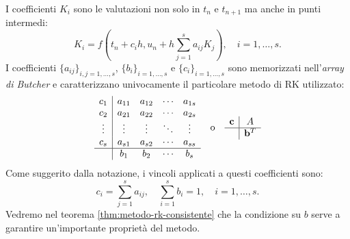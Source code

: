 I coefficienti $K_{i}$ sono le valutazioni non solo in $t_{n}$ e $t_{n+1}$ ma anche in punti intermedi:
\begin{equation}
K_{i} =f\left( t_{n} +c_{i} h,u_{n} +h\sum\limits ^{s}_{j=1} a_{ij} K_{j}\right) ,\quad i=1,\dotsc ,s.
\end{equation}
I coefficienti $\{a_{ij}\}_{i,j=1,\dotsc ,s}$, $\{b_{i}\}_{i=1,\dotsc ,s}$ e $\{c_{i}\}_{i=1,\dotsc ,s}$ sono memorizzati nell'\textit{array di Butcher} e caratterizzano univocamente il particolare metodo di RK utilizzato:
\begin{equation}
\begin{array}{ c|c c c c }
c_{1} & a_{11} & a_{12} & \cdots  & a_{1s}\\
c_{2} & a_{21} & a_{22} & \cdots  & a_{2s}\\
\vdots  & \vdots  & \vdots  & \ddots  & \vdots \\
c_{s} & a_{s1} & a_{s2} & \cdots  & a_{ss}\\
\hline
 & b_{1} & b_{2} & \cdots  & b_{s}
\end{array} \quad \text{o} \quad \begin{array}{ c|c }
\mathbf{c} & A\\
\hline
 & \mathbf{b}^{T}
\end{array}
\end{equation}
Come suggerito dalla notazione, i vincoli applicati a questi coefficienti sono:
\begin{equation}
\label{eq:ipotesi-rk}
c_{i} =\sum\limits ^{s}_{j=1} a_{ij} ,\quad \sum\limits ^{s}_{i=1} b_{i} =1,\quad i=1,\dotsc ,s.
\end{equation}
Vedremo nel teorema \ref{thm:metodo-rk-consistente} che la condizione su $b$ serve a garantire un'importante proprietà del metodo.

